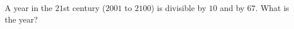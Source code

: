 A year in the $21$st century ($2001$ to $2100$) is divisible by $10$ and by $67$. What is the year?

